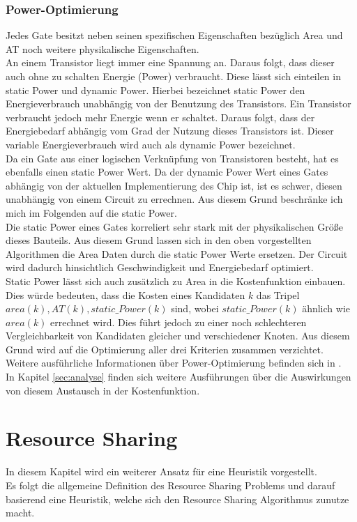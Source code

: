 \documentclass[11pt, a4paper, german]{article}
\begin{document}
\subsubsection{Power-Optimierung}
Jedes Gate besitzt neben seinen spezifischen Eigenschaften bezüglich Area und AT noch weitere physikalische Eigenschaften.\\
An einem Transistor liegt immer eine Spannung an. Daraus folgt, dass dieser auch ohne zu schalten Energie (Power) verbraucht. Diese lässt sich einteilen in static Power und dynamic Power. Hierbei bezeichnet static Power den Energieverbrauch unabhängig von der Benutzung des Transistors. Ein Transistor verbraucht jedoch mehr Energie wenn er schaltet. Daraus folgt, dass der Energiebedarf abhängig vom Grad der Nutzung dieses Transistors ist. Dieser variable Energieverbrauch wird auch als dynamic Power bezeichnet.\\
Da ein Gate aus einer logischen Verknüpfung von Transistoren besteht, hat es ebenfalls einen static Power Wert. Da der dynamic Power Wert eines Gates abhängig von der aktuellen Implementierung des Chip ist, ist es schwer, diesen unabhängig von einem Circuit zu errechnen. Aus diesem Grund beschränke ich mich im Folgenden auf die static Power. \\
Die static Power eines Gates korreliert sehr stark mit der physikalischen Größe dieses Bauteils. Aus diesem Grund lassen sich in den oben vorgestellten Algorithmen die Area Daten durch die static Power Werte ersetzen. Der Circuit wird dadurch hinsichtlich Geschwindigkeit und Energiebedarf optimiert. \\
Static Power lässt sich auch zusätzlich zu Area in die Kostenfunktion einbauen. Dies würde bedeuten, dass die Kosten eines Kandidaten $k$ das Tripel $area(k), AT(k), static\_Power(k)$ sind, wobei $static\_Power(k)$ ähnlich wie $area(k)$ errechnet wird. Dies führt jedoch zu einer noch schlechteren Vergleichbarkeit von Kandidaten gleicher und verschiedener Knoten. Aus diesem Grund wird auf die Optimierung aller drei Kriterien zusammen verzichtet. \\
Weitere ausführliche Informationen über Power-Optimierung befinden sich in \cite{Daboul}.\\
In Kapitel \ref{sec:analyse} finden sich weitere Ausführungen über die Auswirkungen von diesem Austausch in der Kostenfunktion.


\section{Resource Sharing}\label{sec:resource_sh}
In diesem Kapitel wird ein weiterer Ansatz für eine Heuristik vorgestellt.\\
Es folgt die allgemeine Definition des Resource Sharing Problems und darauf basierend eine Heuristik, welche sich den Resource Sharing Algorithmus zunutze macht.
\end{document}
